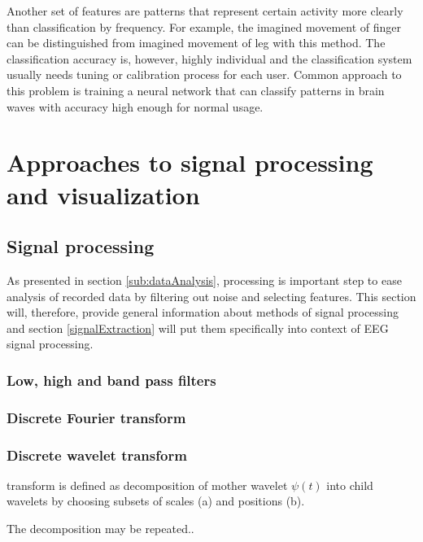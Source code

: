 Another set of features are patterns that represent certain activity more
clearly than classification by frequency. For example, the imagined movement of
finger can be distinguished from imagined movement of leg with this method. The
classification accuracy is, however, highly individual and the classification
system usually needs tuning or calibration process for each user. \cite{bcComm}
Common approach to this problem is training a neural network that can classify
patterns in brain waves with accuracy high enough for normal usage.

\chapter{Approaches to signal processing and visualization} \label{appProcVis}
\section{Signal processing} \label{sec:sigProc}
As presented in section \ref{sub:dataAnalysis}, processing is important
step to ease analysis of recorded data by filtering out noise and selecting
features. This section will, therefore, provide general information about
methods of signal processing and section \ref{signalExtraction} will put them
specifically into context of EEG signal processing.


\subsection{Low, high and band pass filters}

\subsection{Discrete Fourier transform}

\subsection{Discrete wavelet transform}
transform is defined as decomposition of mother wavelet $\psi(t)$ into child
wavelets by choosing subsets of scales (a) and positions (b). 

The decomposition may be repeated..

